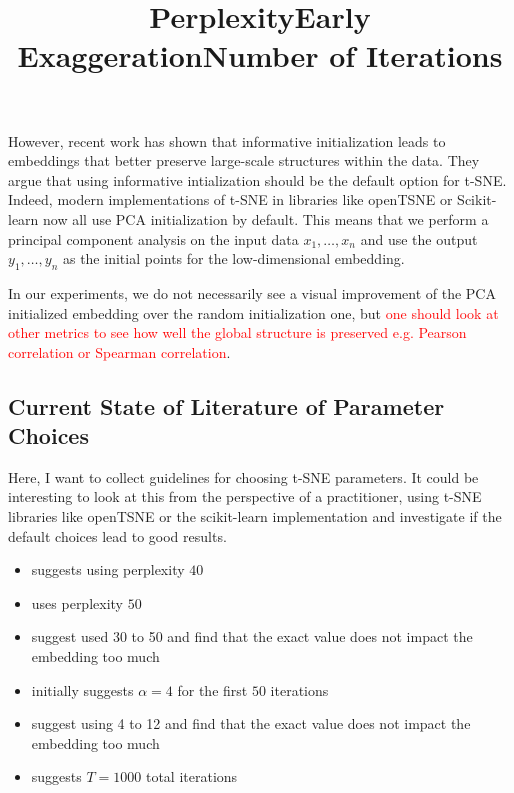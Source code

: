 However, recent work \cite{kobak21} has shown that informative initialization leads to embeddings that better preserve large-scale structures within the data. 
They argue that using informative intialization should be the default option for t-SNE.
Indeed, modern implementations of t-SNE in libraries like openTSNE \cite{openTSNE} or Scikit-learn now all use PCA initialization by default. 
This means that we perform a principal component analysis on the input data $x_1, \dots, x_n$ and use the output $y_1, \dots, y_n$ as the initial points for the low-dimensional embedding. 

In our experiments, we do not necessarily see a visual improvement of the PCA initialized embedding over the random initialization one, but \textcolor{red}{one should look at other metrics to see how well the global structure is preserved e.g. Pearson correlation or Spearman correlation}. 

\subsection{Current State of Literature of Parameter Choices}
Here, I want to collect guidelines for choosing t-SNE parameters. It could be interesting to look at this from the perspective of a practitioner, using t-SNE libraries like openTSNE or the scikit-learn implementation and investigate if the default choices lead to good results. 



\title{Perplexity}
\begin{itemize}
  \item \cite{vdMaa08} suggests using perplexity $40$ 
  \item \cite{vdMaa14} uses perplexity $50$ 
  \item \cite{belkina19} suggest used 30 to 50 and find that the exact value does not impact the embedding too much 
\end{itemize}

\title{Early Exaggeration}
\begin{itemize}
  \item \cite{vdMaa08} initially suggests $\alpha = 4$ for the first $50$ iterations 
  \item \cite{belkina19} suggest using 4 to 12 and find that the exact value does not impact the embedding too much 
\end{itemize}

\title{Number of Iterations}
\begin{itemize}
  \item \cite{vdMaa08} suggests $T=1000$ total iterations 
\end{itemize}

